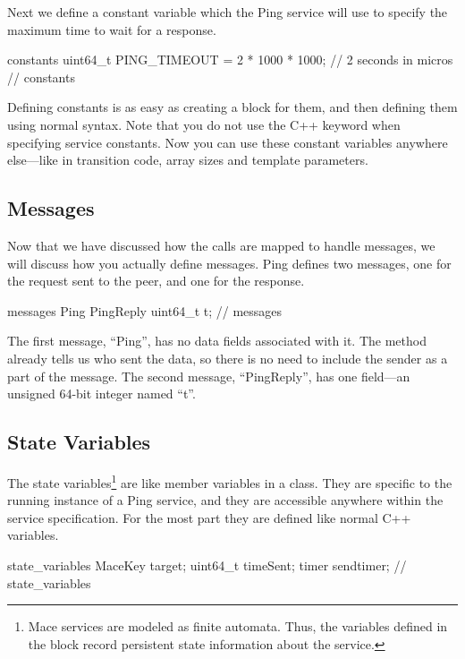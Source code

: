 Next we define a constant variable which the Ping service will use to
specify the maximum time to wait for a response.

\begin{programlisting}
constants {
  uint64_t PING_TIMEOUT = 2 * 1000 * 1000; // 2 seconds in micros
} // constants
\end{programlisting}

Defining constants is as easy as creating a block for them, and then defining
them using normal syntax.  Note that you do not use the C++ keyword
 when specifying service constants.  Now you can use these
constant variables anywhere else---like in transition code, array sizes and
template parameters.

\subsection{Messages}
\label{sec:firstmessages}

Now that we have discussed how the calls are mapped to handle
messages, we will discuss how you actually define messages.  Ping
defines two messages, one for the request sent to the peer, and one
for the response.

\begin{programlisting}
messages {
  Ping { }
  PingReply {
    uint64_t t;
  }
} // messages
\end{programlisting}

The first message, ``Ping'', has no data fields associated with it.
The  method already tells us who sent the data, so
there is no need to include the sender as a part of the message.  The
second message, ``PingReply'', has one field---an unsigned 64-bit
integer named ``t''.

\subsection{State Variables}
\label{sec:state-variables}

The state variables\footnote{Mace services are modeled as finite automata.
Thus, the variables defined in the  block record
persistent state information about the service.} are like member variables in
a class.  They are specific to the running instance of a Ping service, and
they are accessible anywhere within the service specification.  For the most
part they are defined like normal C++ variables.

\begin{programlisting}
state_variables {
  MaceKey target;
  uint64_t timeSent;
  timer sendtimer;
} // state_variables
\end{programlisting}

